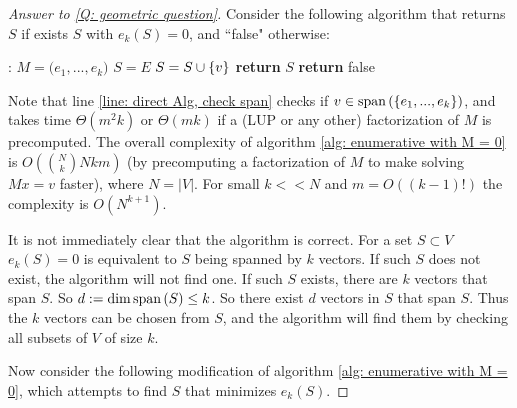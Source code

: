 \documentclass{article}
\begin{document}
\begin{proof}[Answer to \ref{Q: geometric question}]
Consider the following algorithm that returns $S$ if exists $S$ with $e_k(S) = 0$, and ``false" otherwise:
\begin{algorithm}[H]
      \caption{}\label{alg: enumerative with M = 0}
    \begin{algorithmic}[1]
    :
        \State $M = \Big(e_1,...,e_k\Big)$
        \State $S = E$
            \label{line: direct Alg, check span}
                \State $S = S\cup \left\{v\right\}$
            \EndIf
        \EndFor
            \State \textbf{return} $S$
        \EndIf
    \EndFor
    \State \textbf{return} false
    \EndProcedure
    \end{algorithmic}
\end{algorithm}

Note that line \ref{line: direct Alg, check span} checks if $v\in \text{span}\left(\left\{e_1,...,e_k\right\}\right)$, and takes time $\Theta(m^2k)$ or $\Theta(mk)$ if a (LUP or any other) factorization of $M$ is precomputed. The overall complexity of algorithm \ref{alg: enumerative with M = 0} is $O(\binom{N}{k}Nkm)$ (by precomputing a factorization of $M$ to make solving $Mx=v$ faster), where $N = |V|$. For small $k<<N$ and $m = O((k-1)!)$ the complexity is $O(N^{k+1})$.

It is not immediately clear that the algorithm is correct. For a set $S\subset V$ $e_k(S)=0$ is equivalent to $S$ being spanned by $k$ vectors. If such $S$ does not exist, the algorithm will not find one. If such $S$ exists, there are $k$ vectors that span $S$. So $d := \dim \text{span}\left(S\right) \leq k$. So there exist $d$ vectors in $S$ that span $S$. Thus the $k$ vectors can be chosen from $S$, and the algorithm will find them by checking all subsets of $V$ of size $k$.

Now consider the following modification of algorithm \ref{alg: enumerative with M = 0}, which attempts to find $S$ that minimizes $e_k(S)$.


\end{proof}
\end{document}
